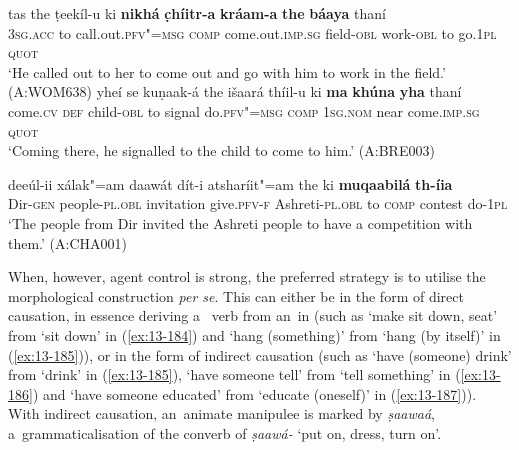 \ea
\label{ex:13-181}
\gll tas the ṭeekíl-u ki \textbf{nikhá} \textbf{c̣híitr-a} \textbf{kráam-a} \textbf{the} \textbf{báaya} thaní\\
\textsc{3sg.acc} to call.out.\textsc{pfv"=msg} \textsc{comp} come.out.\textsc{imp.sg} field-\textsc{obl}  work-\textsc{obl} to go.\textsc{1pl} \textsc{quot}\\
\glt `He called out to her to come out and go with him to work in the field.' (A:WOM638)
\ex
\label{ex:13-182}
\gll yheí se kuṇaak-á the išaará thíil-u ki \textbf{ma} \textbf{khúna} \textbf{yha} thaní\\
come.\textsc{cv} \textsc{def} child-\textsc{obl} to signal do.\textsc{pfv"=msg} \textsc{comp} \textsc{1sg.nom} near come.\textsc{imp.sg} \textsc{quot}\\
\glt `Coming there, he signalled to the child to come to him.' (A:BRE003)

\ex
\label{ex:13-183}
\gll deeúl-ii xálak"=am daawát dít-i atsharíit"=am the ki \textbf{muqaabilá} \textbf{th-íia}\\
Dir-\textsc{gen}  people-\textsc{pl.obl} invitation give.\textsc{pfv-f} Ashreti-\textsc{pl.obl} to \textsc{comp} contest do-\textsc{1pl}\\
\glt `The people from Dir invited the Ashreti people to have a competition with them.' (A:CHA001) 
\z

When, however, agent control is strong, the preferred strategy is to utilise the morphological  construction \textit{per se}. This can either be in the form of direct causation, in essence deriving a~ verb from an~in (such as `make sit down, seat' from `sit down' in (\ref{ex:13-184}) and `hang (something)' from `hang (by itself)' in (\ref{ex:13-185})), or in the form of indirect causation (such as `have (someone) drink' from `drink' in (\ref{ex:13-185}), `have someone tell' from `tell something' in (\ref{ex:13-186}) and `have someone educated' from `educate (oneself)' in (\ref{ex:13-187})). With indirect causation, an~animate manipulee is marked by \textit{ṣaawaá}, a~grammaticalisation of the converb of \textit{ṣaawá-} `put on, dress, turn on'.

